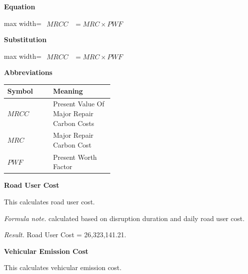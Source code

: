 \documentclass{article}
\begin{document}
\vspace{0.4em}
\textbf{Equation}\par\vspace{-0.35em}
\begin{center}
\begin{adjustbox}{max width=\linewidth}
$\displaystyle\begin{aligned}
MRCC &= MRC \times PWF
\end{aligned}$
\end{adjustbox}
\end{center}
\vspace{0.4em}
\textbf{Substitution}\par\vspace{-0.35em}
\begin{center}
\begin{adjustbox}{max width=\linewidth}
$\displaystyle\begin{aligned}
MRCC &= MRC \times PWF
\end{aligned}$
\end{adjustbox}
\end{center}
\vspace{0.4em}
\textbf{Abbreviations}\par\vspace{-0.35em}
\begin{tabularx}{\linewidth}{>{\raggedright\arraybackslash}p{0.43\linewidth} >{\raggedright\arraybackslash}X}
\toprule
Symbol & Meaning \\
\midrule
$MRCC$ & Present Value Of Major Repair Carbon Costs \\
$MRC$ & Major Repair Carbon Cost \\
$PWF$ & Present Worth Factor \\
\bottomrule
\end{tabularx}
\vspace{0.6em}
\vspace{0.4em}
\textbf{Road User Cost}\par\vspace{-0.35em}
This calculates road user cost.

\textit{Formula note.} calculated based on disruption duration and daily road user cost.

\textit{Result.} Road User Cost = 26,323,141.21.

\vspace{0.4em}
\textbf{Vehicular Emission Cost}\par\vspace{-0.35em}
This calculates vehicular emission cost.
\end{document}
